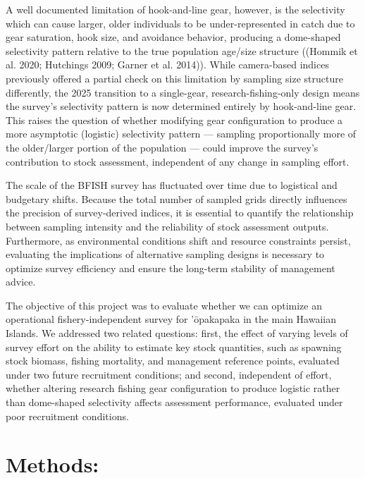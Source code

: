 \documentclass[
  letterpaper,
  12pt,
  letterpaper]{report}
\begin{document}
A well documented limitation of hook-and-line gear, however, is the
selectivity which can cause larger, older individuals to be
under-represented in catch due to gear saturation, hook size, and
avoidance behavior, producing a dome-shaped selectivity pattern relative
to the true population age/size structure ((Hommik et al. 2020;
Hutchings 2009; Garner et al. 2014)). While camera-based indices
previously offered a partial check on this limitation by sampling size
structure differently, the 2025 transition to a single-gear,
research-fishing-only design means the survey's selectivity pattern is
now determined entirely by hook-and-line gear. This raises the question
of whether modifying gear configuration to produce a more asymptotic
(logistic) selectivity pattern --- sampling proportionally more of the
older/larger portion of the population --- could improve the survey's
contribution to stock assessment, independent of any change in sampling
effort.

The scale of the BFISH survey has fluctuated over time due to logistical
and budgetary shifts. Because the total number of sampled grids directly
influences the precision of survey-derived indices, it is essential to
quantify the relationship between sampling intensity and the reliability
of stock assessment outputs. Furthermore, as environmental conditions
shift and resource constraints persist, evaluating the implications of
alternative sampling designs is necessary to optimize survey efficiency
and ensure the long-term stability of management advice.

The objective of this project was to evaluate whether we can optimize an
operational fishery-independent survey for 'ōpakapaka in the main
Hawaiian Islands. We addressed two related questions: first, the effect
of varying levels of survey effort on the ability to estimate key stock
quantities, such as spawning stock biomass, fishing mortality, and
management reference points, evaluated under two future recruitment
conditions; and second, independent of effort, whether altering research
fishing gear configuration to produce logistic rather than dome-shaped
selectivity affects assessment performance, evaluated under poor
recruitment conditions.


\chapter{Methods:}\label{sec-methods}
\end{document}

